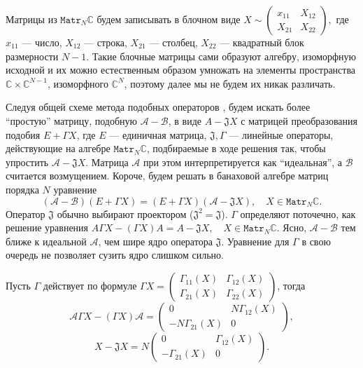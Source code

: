 Матрицы из \( \mathtt{Matr}_N\mathbb{C} \) будем записывать в блочном виде
\( X \sim
    \begin{pmatrix}
    x_{11} & X_{12} \\
    X_{21} & X_{22}
    \end{pmatrix}, \)
    где \( x_{11} \) --- число,
    \( X_{12} \) --- строка, \( X_{21} \) --- столбец,
    \( X_{22} \) --- квадратный блок размерности \( N-1 \).
Такие блочные матрицы сами образуют алгебру, изоморфную исходной
и их можно естественным образом умножать
на элементы пространства \( \mathbb{C}\times\mathbb{C}^{N-1} \),
изоморфного \( \mathbb{C}^N \),
поэтому далее мы не будем их никак различать.

Следуя общей схеме метода подобных операторов \cite{baskakov-split},
будем искать более ``простую'' матрицу, подобную \( \mathcal{A} - \mathcal{B} \),
в виде \( A - \mathfrak{J} X \)
с матрицей преобразования подобия \( E + \Gamma X \),
где \( E \) --- единичная матрица,
\( \mathfrak{J},\Gamma \) --- линейные операторы,
действующие на алгебре \( \mathtt{Matr}_N\mathbb{C} \),
подбираемые в ходе решения так, чтобы упростить \( \mathcal{A} - \mathfrak{J}X \).
Матрица \( \mathcal{A} \) при этом интерпретируется как ``идеальная'',
а \( \mathcal{B} \) считается возмущением.
Короче, будем решать в банаховой алгебре матриц порядка \( N \) уравнение
\begin{equation}\label{simeqn}
    (\mathcal{A-B})(E+\Gamma X) = (E+\Gamma X)(\mathcal{A} - \mathfrak{J} X), \quad X\in\mathtt{Matr}_N\mathbb{C}.
    \end{equation}
Оператор \( \mathfrak{J} \) обычно выбирают проектором (\(\mathfrak{J}^2=\mathfrak{J}\)).
\( \Gamma \) определяют поточечно, как решение уравнения
\( A\Gamma X - (\Gamma X) A = A - \mathfrak{J} X, \quad X\in\mathtt{Matr}_N\mathbb{C} \).
Ясно, \( \mathcal{A}-\mathcal{B} \) тем ближе к идеальной \( \mathcal{A} \),
чем шире ядро оператора \( \mathfrak{J} \).
Уравнение для \( \Gamma \) в свою очередь не позволяет сузить ядро слишком сильно.

Пусть \( \Gamma \) действует по формуле
\( \Gamma X = \begin{pmatrix} \Gamma_{11}(X) & \Gamma_{12}(X) \\
                              \Gamma_{21}(X) & \Gamma_{22}(X)
                              \end{pmatrix} \), тогда
\[
    \mathcal{A} \Gamma X - (\Gamma X)\mathcal{A} = 
    \begin{pmatrix} 0 & N\Gamma_{12}(X) \\
        - N\Gamma_{21}(X) & 0
        \end{pmatrix}, \]
\[
    X - \mathfrak{J} X =
    N \begin{pmatrix} 0 & \Gamma_{12}(X) \\
        - \Gamma_{21}(X) & 0
        \end{pmatrix}.
    \]

